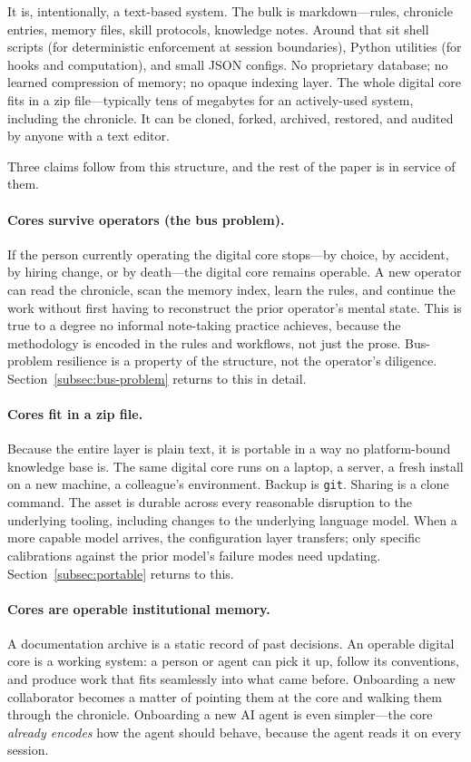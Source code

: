 \documentclass[12pt]{article}
\begin{document}
It is, intentionally, a text-based system. The bulk is markdown---rules, chronicle entries, memory files, skill protocols, knowledge notes. Around that sit shell scripts (for deterministic enforcement at session boundaries), Python utilities (for hooks and computation), and small JSON configs. No proprietary database; no learned compression of memory; no opaque indexing layer. The whole digital core fits in a zip file---typically tens of megabytes for an actively-used system, including the chronicle. It can be cloned, forked, archived, restored, and audited by anyone with a text editor.

Three claims follow from this structure, and the rest of the paper is in service of them.

\paragraph{Cores survive operators (the bus problem).} If the person currently operating the digital core stops---by choice, by accident, by hiring change, or by death---the digital core remains operable. A new operator can read the chronicle, scan the memory index, learn the rules, and continue the work without first having to reconstruct the prior operator's mental state. This is true to a degree no informal note-taking practice achieves, because the methodology is encoded in the rules and workflows, not just the prose. Bus-problem resilience is a property of the structure, not the operator's diligence. Section~\ref{subsec:bus-problem} returns to this in detail.

\paragraph{Cores fit in a zip file.} Because the entire layer is plain text, it is portable in a way no platform-bound knowledge base is. The same digital core runs on a laptop, a server, a fresh install on a new machine, a colleague's environment. Backup is \texttt{git}. Sharing is a clone command. The asset is durable across every reasonable disruption to the underlying tooling, including changes to the underlying language model. When a more capable model arrives, the configuration layer transfers; only specific calibrations against the prior model's failure modes need updating. Section~\ref{subsec:portable} returns to this.

\paragraph{Cores are operable institutional memory.} A documentation archive is a static record of past decisions. An operable digital core is a working system: a person or agent can pick it up, follow its conventions, and produce work that fits seamlessly into what came before. Onboarding a new collaborator becomes a matter of pointing them at the core and walking them through the chronicle. Onboarding a new AI agent is even simpler---the core \emph{already encodes} how the agent should behave, because the agent reads it on every session.
\end{document}
